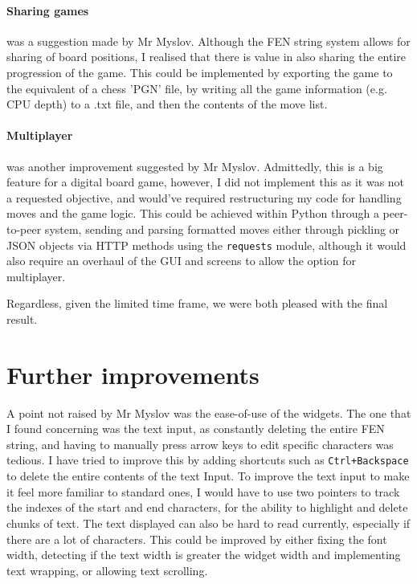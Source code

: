 \documentclass[../main/main.tex]{subfiles}
\begin{document}
\paragraph{Sharing games} was a suggestion made by Mr Myslov. Although the FEN string system allows for sharing of board positions, I realised that there is value in also sharing the entire progression of the game. This could be implemented by exporting the game to the equivalent of a chess 'PGN' file, by writing all the game information (e.g. CPU depth) to a .txt file, and then the contents of the move list.

\paragraph{Multiplayer} was another improvement suggested by Mr Myslov. Admittedly, this is a big feature for a digital board game, however, I did not implement this as it was not a requested objective, and would've required restructuring my code for handling moves and the game logic. This could be achieved within Python through a peer-to-peer system, sending and parsing formatted moves either through pickling or JSON objects via HTTP methods using the \lstinline{requests} module, although it would also require an overhaul of the GUI and screens to allow the option for multiplayer.

Regardless, given the limited time frame, we were both pleased with the final result.

\section{Further improvements}
A point not raised by Mr Myslov was the ease-of-use of the widgets. The one that I found concerning was the text input, as constantly deleting the entire FEN string, and having to manually press arrow keys to edit specific characters was tedious. I have tried to improve this by adding shortcuts such as \verb|Ctrl+Backspace| to delete the entire contents of the text Input. To improve the text input to make it feel more familiar to standard ones, I would have to use two pointers to track the indexes of the start and end characters, for the ability to highlight and delete chunks of text. The text displayed can also be hard to read currently, especially if there are a lot of characters. This could be improved by either fixing the font width, detecting if the text width is greater the widget width and implementing text wrapping, or allowing text scrolling.
\end{document}
